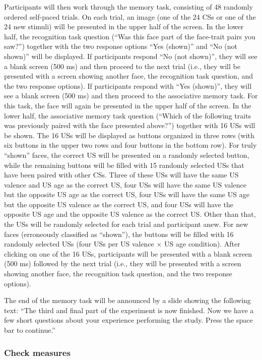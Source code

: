 \documentclass[
  doc,floatsintext]{apa6}
\begin{document}
Participants will then work through the memory task, consisting of 48 randomly ordered self-paced trials.
On each trial, an image (one of the 24 CSs or one of the 24 new stimuli) will be presented in the upper half of the screen.
In the lower half, the recognition task question (``Was this face part of the face-trait pairs you saw?'') together with the two response options ``Yes (shown)'' and ``No (not shown)'' will be displayed.
If participants respond ``No (not shown)'', they will see a blank screen (500 ms) and then proceed to the next trial (i.e., they will be presented with a screen showing another face, the recognition task question, and the two response options).
If participants respond with ``Yes (shown)'', they will see a blank screen (500 ms) and then proceed to the associative memory task.
For this task, the face will again be presented in the upper half of the screen.
In the lower half, the associative memory task question (``Which of the following traits was previously paired with the face presented above?'') together with 16 USs will be shown.
The 16 USs will be displayed as buttons organized in three rows (with six buttons in the upper two rows and four buttons in the bottom row).
For truly ``shown'' faces, the correct US will be presented on a randomly selected button, while the remaining buttons will be filled with 15 randomly selected USs that have been paired with other CSs.
Three of these USs will have the same US valence and US age as the correct US, four USs will have the same US valence but the opposite US age as the correct US, four USs will have the same US age but the opposite US valence as the correct US, and four USs will have the opposite US age and the opposite US valence as the correct US.
Other than that, the USs will be randomly selected for each trial and participant anew.
For new faces (erroneously classified as ``shown''), the buttons will be filled with 16 randomly selected USs (four USs per US valence \(\times\) US age condition). After clicking on one of the 16 USs, participants will be presented with a blank screen (500 ms) followed by the next trial (i.e., they will be presented with a screen showing another face, the recognition task question, and the two response options).

The end of the memory task will be announced by a slide showing the following text:
``The third and final part of the experiment is now finished.
Now we have a few short questions about your experience performing the study.
Press the space bar to continue.''

\hypertarget{check-measures}{%
\subsubsection{Check measures}\label{check-measures}}
\end{document}
